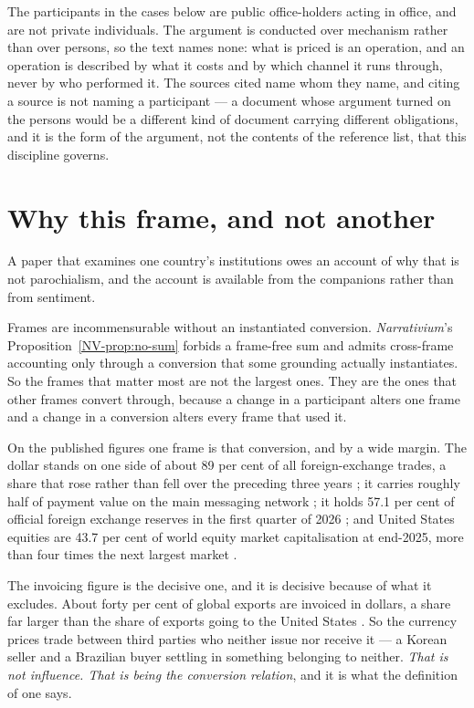\documentclass[11pt,a4paper]{article}
\theoremstyle{remark}
\begin{document}
The participants in the cases below are public office-holders acting in office, and are not private
individuals. The argument is conducted over mechanism rather than over persons, so the text names none:
what is priced is an operation, and an operation is described by what it costs and by which channel it
runs through, never by who performed it. The sources cited name whom they name, and citing a source is
not naming a participant --- a document whose argument turned on the persons would be a different kind of
document carrying different obligations, and it is the form of the argument, not the contents of the
reference list, that this discipline governs.

\section{Why this frame, and not another}\label{sec:cog}
A paper that examines one country's institutions owes an account of why that is not parochialism,
and the account is available from the companions rather than from sentiment.

Frames are incommensurable without an instantiated conversion. \emph{Narrativium}'s Proposition~\ref{NV-prop:no-sum}
forbids a frame-free sum and admits cross-frame accounting only through a conversion that some grounding
actually instantiates. So the frames that matter most are not the largest ones. They are the ones
that other frames convert through, because a change in a participant alters one frame and a change in a
conversion alters every frame that used it.

On the published figures one frame is that conversion, and by a wide margin. The dollar stands on
one side of about 89 per cent of all foreign-exchange trades, a share that rose rather than fell over
the preceding three years \citep{bisfx}; it carries roughly half of payment value on the main messaging
network \citep{swift2026}; it holds 57.1 per cent of official foreign exchange reserves in the first
quarter of 2026 \citep{cofer2026,cofernote2026}; and United States equities are 43.7 per cent of world equity market
capitalisation at end-2025, more than four times the next largest market \citep{equity2026}.

The invoicing figure is the decisive one, and it is decisive because of what it excludes. About
forty per cent of global exports are invoiced in dollars, a share far larger than the share of
exports going to the United States \citep{invoicing2026}. So the currency prices trade between
third parties who neither issue nor receive it --- a Korean seller and a Brazilian buyer settling in
something belonging to neither. \emph{That is not influence. That is being the conversion relation}, and
it is what the definition of one says.
\end{document}
